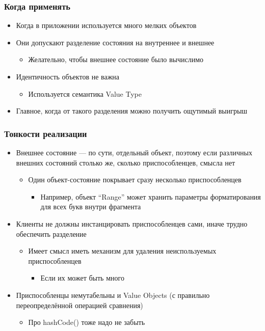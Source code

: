 \documentclass[xetex,mathserif,serif]{beamer}
\begin{document}
	\begin{frame}
		\frametitle{Когда применять}
		\begin{itemize}
			\item Когда в приложении используется много мелких объектов
			\item Они допускают разделение состояния на внутреннее и внешнее
			\begin{itemize}
				\item Желательно, чтобы внешнее состояние было вычислимо
			\end{itemize}
			\item Идентичность объектов не важна
			\begin{itemize}
				\item Используется семантика Value Type
			\end{itemize}
			\item Главное, когда от такого разделения можно получить ощутимый выигрыш
		\end{itemize}
	\end{frame}

	\begin{frame}
		\frametitle{Тонкости реализации}
		\begin{itemize}
			\item Внешнее состояние --- по сути, отдельный объект, поэтому если различных внешних состояний столько же, сколько приспособленцев, смысла нет
			\begin{itemize}
				\item Один объект-состояние покрывает сразу несколько приспособленцев
				\begin{itemize}
					\item Например, объект ``Range'' может хранить параметры форматирования для всех букв внутри фрагмента
				\end{itemize}
			\end{itemize}
			\item Клиенты не должны инстанцировать приспособленцев сами, иначе трудно обеспечить разделение
			\begin{itemize}
				\item Имеет смысл иметь механизм для удаления неиспользуемых приспособленцев
				\begin{itemize}
					\item Если их может быть много
				\end{itemize}
			\end{itemize}
			\item Приспособленцы немутабельны и Value Objects (с правильно переопределённой операцией сравнения)
			\begin{itemize}
				\item Про hashCode() тоже надо не забыть
			\end{itemize}
		\end{itemize}
	\end{frame}
\end{document}

